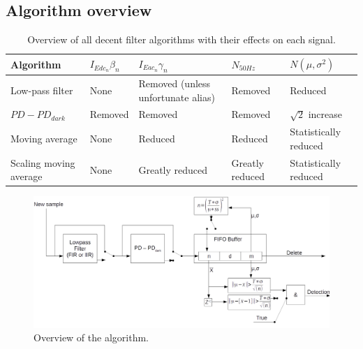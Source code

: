 \subsection{Algorithm overview}
\begin{table}
	\centering
	\label{tab:Filters_summarized}
	\begin{tabular}{lllll}
		\hline
		Algorithm             &\vline $I_{Edc_{n}} \beta_{n}$ & $I_{Eac{_n}} \gamma_{n}$           & $N_{50Hz} $     & $N(\mu,\sigma^2)$    \\ \hline
		Low-pass filter       &\vline None                    & Removed (unless unfortunate alias) & Removed      & Reduced              \\
		$PD - PD_{dark}$      &\vline Removed                 & Removed                            & Removed         & $\sqrt2$ increase    \\
		Moving average        &\vline None                    & Reduced                            & Reduced         & Statistically reduced\\
		Scaling moving average&\vline None                    & Greatly reduced                    & Greatly reduced & Statistically reduced\\ \hline
	\end{tabular}
	\caption{Overview of all decent filter algorithms with their effects on each signal.}
\end{table}

\begin{figure}
	\includegraphics[angle=90,width=\textwidth]{pics/allSTDbasedAlgorithms_expanded.png}
	\caption{Overview of the algorithm.}
	\label{fig:fullAlgorithm}
\end{figure}
